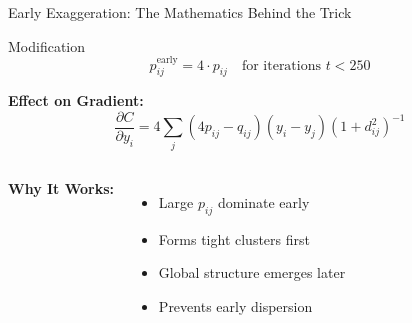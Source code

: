 










\begin{frame}{Early Exaggeration: The Mathematics Behind the Trick}
\begin{block}{Modification}
$$p_{ij}^{\text{early}} = 4 \cdot p_{ij} \quad \text{for iterations } t < 250$$
\end{block}

\textbf{Effect on Gradient:}
$$\frac{\partial C}{\partial y_i} = 4\sum_j (4p_{ij} - q_{ij})(y_i - y_j)(1 + d_{ij}^2)^{-1}$$

\begin{columns}
\textbf{Why It Works:}
\begin{itemize}
\item Large $p_{ij}$ dominate early
\item Forms tight clusters first
\item Global structure emerges later
\item Prevents early dispersion
\end{itemize}

\begin{center}
\end{center}
\end{columns}
\end{frame}

